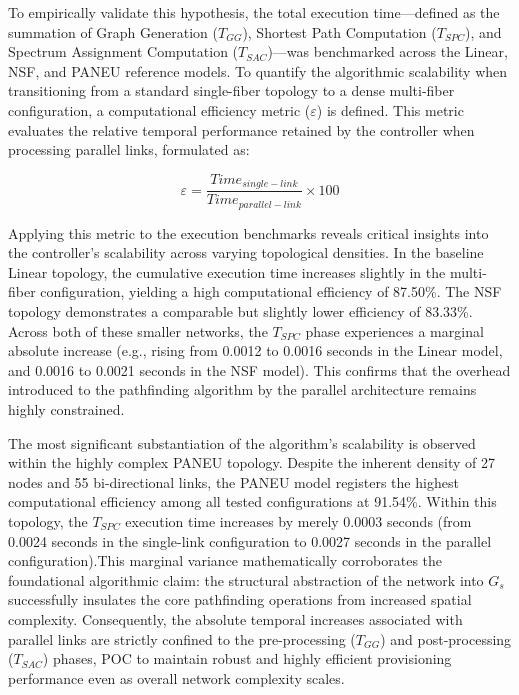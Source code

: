 \documentclass[12pt, a4paper, twoside, openright]{report}
\begin{document}
To empirically validate this hypothesis, the total execution time—defined as the summation of Graph Generation ($T_{GG}$), Shortest Path Computation ($T_{SPC}$), and Spectrum Assignment Computation ($T_{SAC}$)—was benchmarked across the Linear, NSF, and PANEU reference models. To quantify the algorithmic scalability when transitioning from a standard single-fiber topology to a dense multi-fiber configuration, a computational efficiency metric ($\varepsilon$) is defined. This metric evaluates the relative temporal performance retained by the controller when processing parallel links, formulated as:

$$\varepsilon=\frac{Time_{single-link}}{Time_{parallel-link}}\times 100$$

Applying this metric to the execution benchmarks reveals critical insights into the controller's scalability across varying topological densities. In the baseline Linear topology, the cumulative execution time increases slightly in the multi-fiber configuration, yielding a high computational efficiency of 87.50\%. The NSF topology demonstrates a comparable but slightly lower efficiency of 83.33\%. Across both of these smaller networks, the $T_{SPC}$ phase experiences a marginal absolute increase (e.g., rising from 0.0012 to 0.0016 seconds in the Linear model, and 0.0016 to 0.0021 seconds in the NSF model). This confirms that the overhead introduced to the pathfinding algorithm by the parallel architecture remains highly constrained.

The most significant substantiation of the algorithm's scalability is observed within the highly complex PANEU topology. Despite the inherent density of 27 nodes and 55 bi-directional links, the PANEU model registers the highest computational efficiency among all tested configurations at 91.54\%. Within this topology, the $T_{SPC}$ execution time increases by merely 0.0003 seconds (from 0.0024 seconds in the single-link configuration to 0.0027 seconds in the parallel configuration).This marginal variance mathematically corroborates the foundational algorithmic claim: the structural abstraction of the network into $G_s$ successfully insulates the core pathfinding operations from increased spatial complexity. Consequently, the absolute temporal increases associated with parallel links are strictly confined to the pre-processing ($T_{GG}$) and post-processing ($T_{SAC}$) phases, POC to maintain robust and highly efficient provisioning performance even as overall network complexity scales.
\end{document}
